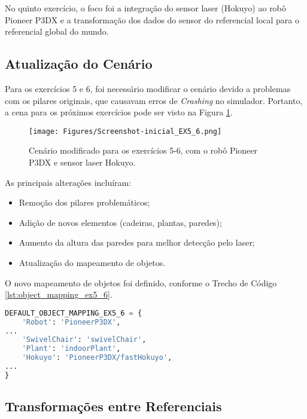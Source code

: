 No quinto exercício, o foco foi a integração do sensor laser (Hokuyo) ao robô Pioneer P3DX e a transformação dos dados do sensor do referencial local para o referencial global do mundo.

\subsection{Atualização do Cenário} \label{subsec:atualizacao-cenario}

Para os exercícios 5 e 6, foi necessário modificar o cenário devido a problemas com os pilares originais, que causavam erros de \textit{Crashing} no simulador. Portanto, a cena para os próximos exercícios pode ser visto na Figura \ref{fig:cenario-ex5-6}.

\begin{figure}[H]
\centering
\texttt{[image: Figures/Screenshot-inicial\_EX5\_6.png]}
\caption{Cenário modificado para os exercícios 5-6, com o robô Pioneer P3DX e sensor laser Hokuyo.}
\label{fig:cenario-ex5-6}
\end{figure}

As principais alterações incluíram:
\begin{itemize}
    \item Remoção dos pilares problemáticos;
    \item Adição de novos elementos (cadeiras, plantas, paredes);
    \item Aumento da altura das paredes para melhor detecção pelo laser;
    \item Atualização do mapeamento de objetos.
\end{itemize}

O novo mapeamento de objetos foi definido, conforme o Trecho de Código \ref{lst:object_mapping_ex5_6}.

\begin{lstlisting}[language=Python, caption=Mapeamento de objetos atualizado para exercícios 5-6., label=lst:object_mapping_ex5_6]
DEFAULT_OBJECT_MAPPING_EX5_6 = {
    'Robot': 'PioneerP3DX',
...
    'SwivelChair': 'swivelChair',
    'Plant': 'indoorPlant',
    'Hokuyo': 'PioneerP3DX/fastHokuyo',
...
}
\end{lstlisting}

\subsection{Transformações entre Referenciais} \label{subsec:transformacoes-referenciais}

